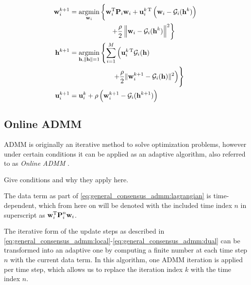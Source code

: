 \documentclass{article}
\newcommand{\h}{\mtxb{h}}
\newcommand{\w}{\mtxb{w}}
\newcommand{\uu}{\mtxb{u}}
\newcommand{\aRho}{\mtxb{P}}
\begin{document}
\begin{align}
    \w_i^{k+1} &= \underset{\w_i}{\operatorname{argmin}} \left\{ \w_i^\T \aRho_i \w_i + \uu_i^{k\,\T} \left(\w_i - \mathcal{G}_i(\h^{k})\right) \vphantom{+ \frac{\rho}{2} \left\| \w_i - \mathcal{G}_i(\h^{k}) \right\|^2}\right.\nonumber\\
    &\left. \qquad \qquad \qquad + \frac{\rho}{2} \left\| \w_i - \mathcal{G}_i(\h^{k}) \right\|^2 \right\}\label{eq:general_consensus_admm:local}\\
    \h^{k+1} &= \underset{\h, \|\h\| = 1}{\operatorname{argmin}} \left\{ \sum_{i=1}^{M} \left( \uu_i^{k\,\T} \mathcal{G}_i(\h) \vphantom{\frac{\rho}{2} \| \w_i^{k+1} - \mathcal{G}_i(\h) \|^2} \right.\right.\nonumber\\
    &\left. \qquad \qquad \qquad \vphantom{\sum_{i=1}^{M} pp } \left.+ \frac{\rho}{2} \| \w_i^{k+1} - \mathcal{G}_i(\h) \|^2  \right) \right\}\label{eq:general_consensus_admm:global}\\
    \uu_i^{k+1} &= \uu_i^{k} + \rho \left( \w_i^{k+1} - \mathcal{G}_i(\h^{k+1}) \right)\label{eq:general_consensus_admm:dual}
\end{align}

\subsection{Online ADMM}
\label{ssec:online_admm}
ADMM is originally an iterative method to solve optimization problems, however under certain conditions it can be applied as an adaptive algorithm, also referred to as \emph{Online ADMM} \cite{}.
\begin{attention}
    Give conditions and why they apply here.
\end{attention}
The data term as part of \eqref{eq:general_consensus_admm:lagrangian} is time-dependent, which from here on  will be denoted with the included time index \(n\) in superscript as \(\w_i^\T \aRho_i^{n} \w_i\).

The iterative form of the update steps as described in \eqref{eq:general_consensus_admm:local}-\eqref{eq:general_consensus_admm:dual} can be transformed into an adaptive one by computing a finite number at each time step \(n\) with the current data term.
In this algorithm, one ADMM iteration is applied per time step, which allows us to replace the iteration index \(k\) with the time index \(n\).
\end{document}

